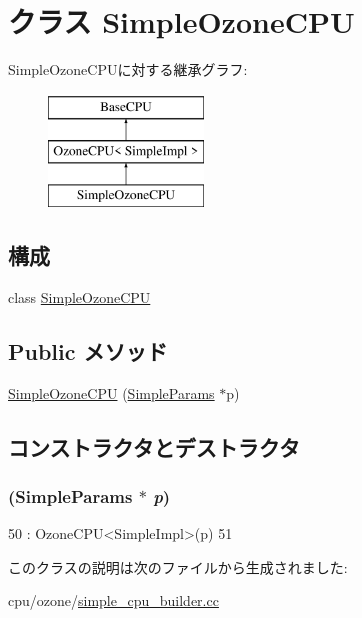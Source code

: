 \hypertarget{classSimpleOzoneCPU}{
\section{クラス SimpleOzoneCPU}
\label{classSimpleOzoneCPU}
}
SimpleOzoneCPUに対する継承グラフ:\begin{figure}[H]
\begin{center}
\leavevmode
\includegraphics[height=3cm]{classSimpleOzoneCPU}
\end{center}
\end{figure}
\subsection*{構成}
\begin{DoxyCompactItemize}
\item 
class \hyperlink{classSimpleOzoneCPU_1_1SimpleOzoneCPU}{SimpleOzoneCPU}
\end{DoxyCompactItemize}
\subsection*{Public メソッド}
\begin{DoxyCompactItemize}
\item 
\hyperlink{classSimpleOzoneCPU_a9a7b392624d34fc42894f130f8ac2553}{SimpleOzoneCPU} (\hyperlink{classSimpleParams}{SimpleParams} $\ast$p)
\end{DoxyCompactItemize}


\subsection{コンストラクタとデストラクタ}
\hypertarget{classSimpleOzoneCPU_a9a7b392624d34fc42894f130f8ac2553}{
\subsubsection[{SimpleOzoneCPU}]{ ({\bf SimpleParams} $\ast$ {\em p})}}
\label{classSimpleOzoneCPU_a9a7b392624d34fc42894f130f8ac2553}



\begin{DoxyCode}
50         : OzoneCPU<SimpleImpl>(p)
51     { }
\end{DoxyCode}


このクラスの説明は次のファイルから生成されました:\begin{DoxyCompactItemize}
\item 
cpu/ozone/\hyperlink{simple__cpu__builder_8cc}{simple\_\-cpu\_\-builder.cc}\end{DoxyCompactItemize}
